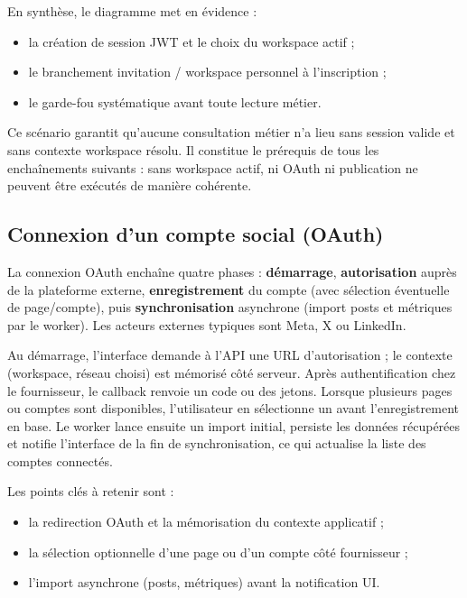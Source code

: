 \documentclass[12pt,a4paper]{report}
\numberwithin{figure}{chapter}
\numberwithin{table}{chapter}
\begin{document}
En synthèse, le diagramme met en évidence :
\begin{itemize}[leftmargin=2em,itemsep=2pt,topsep=4pt]
\item la création de session JWT et le choix du workspace actif ;
\item le branchement invitation / workspace personnel à l’inscription ;
\item le garde-fou systématique avant toute lecture métier.
\end{itemize}

Ce scénario garantit qu’aucune consultation métier n’a lieu sans session valide et sans contexte workspace résolu. Il constitue le prérequis de tous les enchaînements suivants : sans workspace actif, ni OAuth ni publication ne peuvent être exécutés de manière cohérente.

\subsection{Connexion d’un compte social (OAuth)}

La connexion OAuth enchaîne quatre phases : \textbf{démarrage}, \textbf{autorisation} auprès de la plateforme externe, \textbf{enregistrement} du compte (avec sélection éventuelle de page/compte), puis \textbf{synchronisation} asynchrone (import posts et métriques par le worker). Les acteurs externes typiques sont Meta, X ou LinkedIn.

Au démarrage, l’interface demande à l’API une URL d’autorisation ; le contexte (workspace, réseau choisi) est mémorisé côté serveur. Après authentification chez le fournisseur, le callback renvoie un code ou des jetons. Lorsque plusieurs pages ou comptes sont disponibles, l’utilisateur en sélectionne un avant l’enregistrement en base. Le worker lance ensuite un import initial, persiste les données récupérées et notifie l’interface de la fin de synchronisation, ce qui actualise la liste des comptes connectés.

Les points clés à retenir sont :
\begin{itemize}[leftmargin=2em,itemsep=2pt,topsep=4pt]
\item la redirection OAuth et la mémorisation du contexte applicatif ;
\item la sélection optionnelle d’une page ou d’un compte côté fournisseur ;
\item l’import asynchrone (posts, métriques) avant la notification UI.
\end{itemize}
\end{document}
